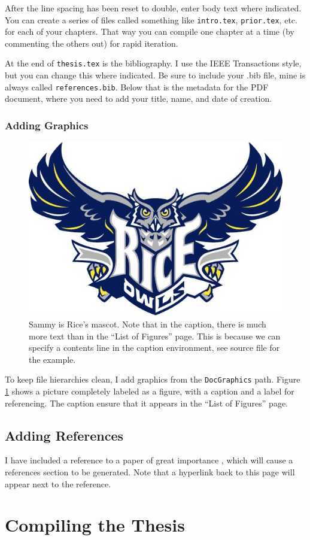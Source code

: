 After the line spacing has been reset to double, enter body text where indicated.  You can create a series of files called something like \verb+intro.tex+, \verb+prior.tex+, etc. for each of your chapters.  That way you can compile one chapter at a time (by commenting the others out) for rapid iteration.

At the end of \verb+thesis.tex+ is the bibliography.  I use the IEEE Transactions style, but you can change this where indicated.  Be sure to include your .bib file, mine is always called \verb+references.bib+.  Below that is the metadata for the PDF document, where you need to add your title, name, and date of creation.

\subsection{Adding Graphics}

\begin{figure}
	\center
	\includegraphics [width=.3\textwidth] {./DocGraphics/sammy.jpg}
	\caption[Go Owls]{Sammy is Rice's mascot.  Note that in the caption, there is much more text than in the ``List of Figures'' page.  This is because we can specify a contents line in the caption environment, see source file for the example.}
	\label{fig:ricelogo}
\end{figure}

To keep file hierarchies clean, I add graphics from the \verb+DocGraphics+ path.  Figure \ref{fig:ricelogo} shows a picture completely labeled as a figure, with a caption and a label for referencing.  The caption ensure that it appears in the ``List of Figures'' page.

\section{Adding References}

I have included a reference to a paper of great importance \cite{Zelst:GreatMeaning}, which will cause a references section to be generated.  Note that a hyperlink back to this page will appear next to the reference.

\chapter{Compiling the Thesis}
\label{chap:compiling}

